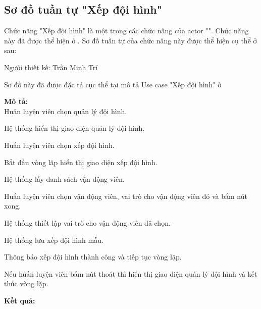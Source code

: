 \subsection{Sơ đồ tuần tự "Xếp đội hình"}
\setcounter{figure}{0}

Chức năng "Xếp đội hình" là một trong các chức năng của actor "".
Chức năng này đã được thể hiện ở \myref{}.
Sơ đồ tuần tự của chức năng này được thể hiện cụ thể ở \myref{} sau:

Người thiết kế: Trần Minh Trí

Sơ đồ này đã được đặc tả cục thể tại mô tả Use case
"Xếp đội hình" ở 

\noindent
\textbf{Mô tả:}\\
Huân luyện viên chọn quản lý đội hình. \par
Hệ thống hiển thị giao diện quản lý đội hình. \par
Huấn luyện viên chọn xếp đội hình. \par
Bắt đầu vòng lăp hiển thị giao diện xếp đội hình. \par
Hệ thống lấy danh sách vận động viên. \par
Huấn luyện viên chọn vận động viên, vai trò cho vận động viên đó và bấm nút xong. \par
Hệ thống thiết lập vai trò cho vận động viên đã chọn. \par
Hệ thống lưu xếp đội hình mẫu. \par
Thông báo xếp đội hình thành công và tiếp tục vòng lặp. \par
Nếu huấn luyện viên bấm nút thoát thì hiển thị giao diện quản lý đội hình và kết thúc vòng lặp.

\noindent
\textbf{Kết quả:}


